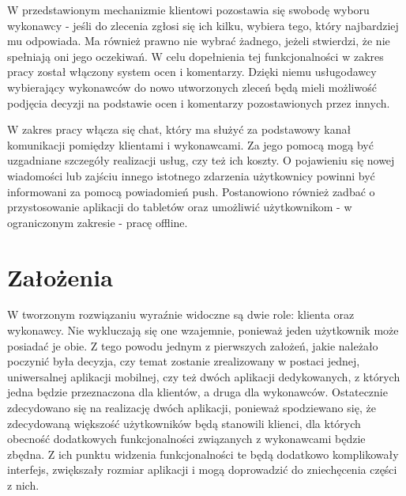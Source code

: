 
W przedstawionym mechanizmie klientowi pozostawia się swobodę wyboru wykonawcy - jeśli do zlecenia zgłosi się ich kilku, wybiera tego, który najbardziej mu odpowiada. Ma również prawno nie wybrać żadnego, jeżeli stwierdzi, że nie spełniają oni jego oczekiwań. W celu dopełnienia tej funkcjonalności w zakres pracy został włączony system ocen i komentarzy. Dzięki niemu usługodawcy wybierający wykonawców do nowo utworzonych zleceń będą mieli możliwość podjęcia decyzji na podstawie ocen i komentarzy pozostawionych przez innych.

W zakres pracy włącza się chat, który ma służyć za podstawowy kanał komunikacji pomiędzy klientami i wykonawcami. Za jego pomocą mogą być uzgadniane szczegóły realizacji usług, czy też ich koszty. O pojawieniu się nowej wiadomości lub zajściu innego istotnego zdarzenia użytkownicy powinni być informowani za pomocą powiadomień push. Postanowiono również zadbać o przystosowanie aplikacji do tabletów oraz umożliwić użytkownikom - w ograniczonym zakresie - pracę offline.

\section{Założenia}

W tworzonym rozwiązaniu wyraźnie widoczne są dwie role: klienta oraz wykonawcy. Nie wykluczają się one wzajemnie, ponieważ jeden użytkownik może posiadać je obie. Z tego powodu jednym z pierwszych założeń, jakie należało poczynić była decyzja, czy temat zostanie zrealizowany w postaci jednej, uniwersalnej aplikacji mobilnej, czy też dwóch aplikacji dedykowanych, z których jedna będzie przeznaczona dla klientów, a druga dla wykonawców. Ostatecznie zdecydowano się na realizację dwóch aplikacji, ponieważ spodziewano się, że zdecydowaną większość użytkowników będą stanowili klienci, dla których obecność dodatkowych funkcjonalności związanych z wykonawcami będzie zbędna. Z ich punktu widzenia funkcjonalności te będą dodatkowo komplikowały interfejs, zwiększały rozmiar aplikacji i mogą doprowadzić do zniechęcenia części z nich.


